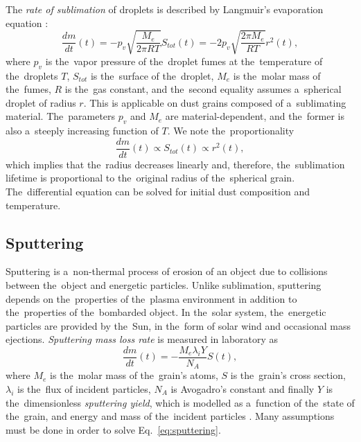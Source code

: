 The \textit{rate of sublimation} of droplets is described by Langmuir's evaporation equation \citep{langmuir1918evaporation}:
\begin{equation}
    \frac{dm}{dt}(t) = -p_{v} \sqrt{\frac{M_e}{2\pi RT}} S_{tot}(t) =  -2 p_{v}  \sqrt{\frac{2 \pi M_e}{RT}} r^2(t) ,
\end{equation}
where $p_v$ is the~vapor pressure of the~droplet fumes at the~temperature of the~droplets $T$, $S_{tot}$ is the~surface of the~droplet, $M_e$ is the~molar mass of the~fumes, $R$ is the~gas constant, and the~second equality assumes a~spherical droplet of radius $r$. This is applicable on dust grains composed of a~sublimating material. The~parameters $p_v$ and $M_e$ are material-dependent, and the~former is also a~steeply increasing function of $T$. We note the~proportionality
\begin{equation}
    \frac{dm}{dt}(t) \propto S_{tot}(t) \propto r^2(t),
\end{equation}
which implies that the~radius decreases linearly and, therefore, the~sublimation lifetime is proportional to the~original radius of the~spherical grain. The~differential equation can be solved for initial dust composition and temperature.   

\subsection{Sputtering}

Sputtering is a~non-thermal process of erosion of an object due to collisions between the~object and energetic particles. Unlike sublimation, sputtering depends on the~properties of the~plasma environment in addition to the~properties of the~bombarded object. In the~solar system, the~energetic particles are provided by the~Sun, in the~form of solar wind and occasional mass ejections. \textit{Sputtering mass loss rate} is measured in laboratory as
\begin{equation}
    \frac{dm}{dt}(t) = - \frac{ M_e \lambda_i Y }{N_A} S(t), 
    \label{eq:sputtering}
\end{equation}
where $M_e$ is the~molar mass of the~grain's atoms, $S$ is the~grain's cross section, $\lambda_i$ is the~flux of incident particles, $N_A$ is Avogadro's constant and finally $Y$ is the~dimensionless \textit{sputtering yield}, which is modelled as a~function of the~state of the~grain, and energy and mass of the~incident particles \citep{vyvsinka2018odpravsovani}. Many assumptions must be done in order to solve Eq.~\ref{eq:sputtering}. 

